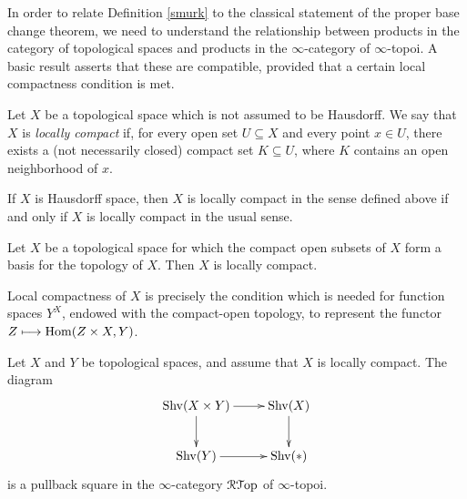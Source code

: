 In order to relate Definition \ref{smurk} to the classical statement of the proper base change theorem, we need to understand the relationship between products in the category of topological spaces and products in the $\infty$-category of $\infty$-topoi. A basic result asserts that these are compatible, provided that a certain local compactness condition is met.

\begin{definition}
Let $X$ be a topological space which is not assumed to be Hausdorff. We say that $X$ is {\it locally compact} if, for every open set $U \subseteq X$ and every point $x \in U$, there
exists a (not necessarily closed) compact set $K \subseteq U$, where $K$ contains an open neighborhood of $x$.
\end{definition}

\begin{example}
If $X$ is Hausdorff space, then $X$ is locally compact in the sense defined above if and only if
$X$ is locally compact in the usual sense.
\end{example}

\begin{example}
Let $X$ be a topological space for which the compact open subsets of $X$ form a basis for the topology of $X$. Then $X$ is locally compact.
\end{example}

\begin{remark}
Local compactness of $X$ is precisely the condition which is needed for function
spaces $Y^X$, endowed with the compact-open topology, to represent the functor
$Z \longmapsto \operatorname{Hom}( Z \times X, Y)$.
\end{remark}

\begin{proposition}\label{cartmun}
Let $X$ and $Y$ be topological spaces, and assume that $X$ is locally compact.
The diagram
$$ \xymatrix{ \Shv(X \times Y) \ar[r] \ar[d] & \Shv(X) \ar[d] \\
\Shv(Y) \ar[r] & \Shv(\ast) }$$
is a pullback square in the $\infty$-category $\operatorname{\mathcal{R}{\mathcal T}op}$ of $\infty$-topoi.
\end{proposition}

